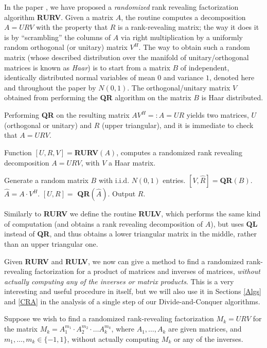 \documentclass{article}
\theoremstyle{definition}
\begin{document}
In the paper \cite{DDH07}, we have proposed a \emph{randomized} rank revealing factorization algorithm \textbf{RURV}. Given a matrix $A$, the routine computes a decomposition $A = URV$ with the property that $R$ is a rank-revealing matrix; the way it does it is by ``scrambling'' the columns of $A$ via right multiplication by a uniformly random orthogonal (or unitary) matrix $V^{H}$. The way to obtain such a random matrix (whose described distribution over the manifold of unitary/orthogonal matrices is known as \emph{Haar}) is to start from a matrix $B$ of independent, identically distributed normal variables of mean $0$ and variance $1$, denoted here and throughout the paper by $N(0,1)$. The orthogonal/unitary matrix $V$ obtained from performing the \textbf{QR} algorithm on the matrix $B$ is Haar distributed. 

Performing \textbf{QR} on the resulting matrix $A V^{H}=:\hat{A} = UR$ yields two matrices, $U$ (orthogonal or unitary) and $R$ (upper triangular), and it is immediate to check that $A = URV$. 

\begin{algorithm}
\protect\caption{Function $[U, R, V] =$\textbf{RURV}$(A)$, computes a randomized rank revealing decomposition $A = URV$, with $V$ a Haar matrix.} 
\begin{algorithmic}[1]
\label{rurv}
\STATE Generate a random matrix $B$ with i.i.d. $N(0,1)$ entries. 
\STATE $[V, \hat{R}] = $\textbf{QR}$(B)$.
\STATE $\hat{A} = A \cdot V^{H}$.
\STATE $[U,R] =$ \textbf{QR}$(\hat{A})$.
\STATE Output $R$.
\end{algorithmic}
\end{algorithm}

Similarly to \textbf{RURV} we define the routine \textbf{RULV}, which performs the same kind of computation (and obtains a rank revealing decomposition of $A$), but uses \textbf{QL} instead of \textbf{QR}, and thus obtains a lower triangular matrix in the middle, rather than an upper triangular one. 

Given \textbf{RURV} and \textbf{RULV}, we now can give a method to find a randomized rank-revealing factorization for a product of matrices and inverses of matrices, \emph{without actually computing any of the inverses or matrix products}. This is a very interesting and useful procedure in itself, but we will also use it in Sections \ref{Algs} and \ref{CRA} in the analysis of a single step of our Divide-and-Conquer algorithms. 

Suppose we wish to find a randomized rank-revealing factorization $M_k = URV$ for the matrix $M_k = A_1^{m_1} \cdot A_2^{m_2} \cdot \ldots A_k^{m_k}$, where $A_1, \ldots, A_k$ are given matrices, and $m_1, \ldots, m_k \in \{-1,1\}$, without actually computing $M_k$ or any of the inverses. 
\end{document}
